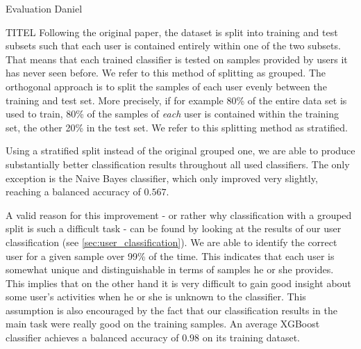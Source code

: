 \begin{section}{Evaluation Daniel}
	\begin{subsection}{TITEL}\label{subsec:stratified}
		Following the original paper, the dataset is split into training and test subsets such that each user is contained entirely within one of the two subsets. That means that each trained classifier is tested on samples provided by users it has never seen before. We refer to this method of splitting as \glqq grouped\grqq{}. The orthogonal approach is to split the samples of each user evenly between the training and test set. More precisely, if for example 80\% of the entire data set is used to train, 80\% of the samples of \emph{each} user is contained within the training set, the other 20\% in the test set. We refer to this splitting method as \glqq stratified\grqq{}. \par
		Using a stratified split instead of the original grouped one, we are able to produce substantially better classification results throughout all used classifiers. The only exception is the Naive Bayes classifier, which only improved very slightly, reaching a balanced accuracy of $0.567$. \par
		A valid reason for this improvement - or rather why classification with a grouped split is such a difficult task - can be found by looking at the results of our user classification (see \ref{sec:user_classification}). We are able to identify the correct user for a given sample over 99\% of the time. This indicates that each user is somewhat unique and distinguishable in terms of samples he or she provides. This implies that on the other hand it is very difficult to gain good insight about some user's activities when he or she is unknown to the classifier. This assumption is also encouraged by the fact that our classification results in the main task were really good on the training samples. An average XGBoost classifier achieves a balanced accuracy of $0.98$ on its training dataset. 
	\end{subsection}
	

\end{section}
